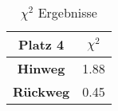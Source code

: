 \begin{table}[H]
    \centering
		\caption{$\chi^{2}$ Ergebnisse}
		\begin{tabular}{|c|c|}
			\hline
			Platz 4 &  $\chi^{2}$\\
			\hline
			\textbf{Hinweg} & 1.88 \\
			\hline
			\textbf{Rückweg} &  0.45\\
			\hline
		\end{tabular}
		\label{tab: Ergebnisse chi quadrat}
\end{table}